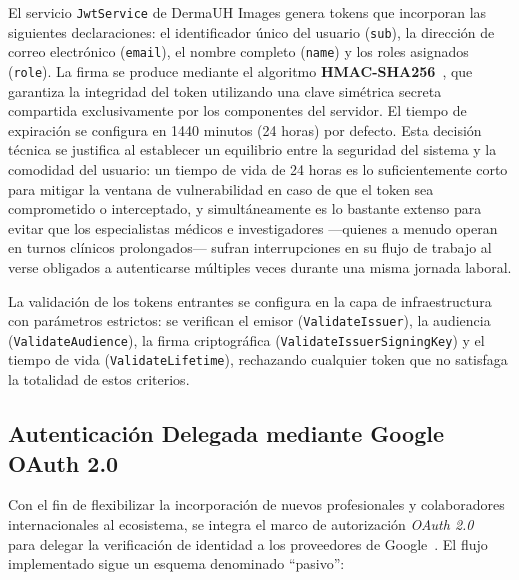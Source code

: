 El servicio \texttt{JwtService} de DermaUH Images genera tokens que incorporan las siguientes 
declaraciones: el identificador único del usuario (\texttt{sub}), la dirección de correo 
electrónico (\texttt{email}), el nombre completo (\texttt{name}) y los roles asignados (\texttt{role}). 
La firma se produce mediante el algoritmo \textbf{HMAC-SHA256}~\cite{rfc2104_hmac}, que garantiza la 
integridad del token utilizando una clave simétrica secreta compartida exclusivamente por los componentes 
del servidor. El tiempo de expiración se configura en 1440 minutos (24 horas) por defecto. Esta 
decisión técnica se justifica al establecer un equilibrio entre la seguridad del sistema y la 
comodidad del usuario: un tiempo de vida de 24 horas es lo suficientemente corto para mitigar la ventana 
de vulnerabilidad en caso de que el token sea comprometido o interceptado, y simultáneamente es lo 
bastante extenso para evitar que los especialistas médicos e investigadores ---quienes a menudo operan 
en turnos clínicos prolongados--- sufran interrupciones en su flujo de trabajo al verse obligados a 
autenticarse múltiples veces durante una misma jornada laboral.

La validación de los tokens entrantes se configura en la capa de infraestructura con parámetros estrictos: 
se verifican el emisor (\texttt{ValidateIssuer}), la audiencia (\texttt{ValidateAudience}), la firma 
criptográfica (\texttt{ValidateIssuerSigningKey}) y el tiempo de vida (\texttt{ValidateLifetime}), 
rechazando cualquier token que no satisfaga la totalidad de estos criterios.

\subsection{Autenticación Delegada mediante Google OAuth 2.0}
Con el fin de flexibilizar la incorporación de nuevos profesionales y colaboradores internacionales al 
ecosistema, se integra el marco de autorización \textit{OAuth 2.0}~\cite{rfc6749_oauth} para delegar 
la verificación de identidad a los proveedores de Google~\cite{google_identity_docs}. El flujo implementado 
sigue un esquema denominado ``pasivo'':

